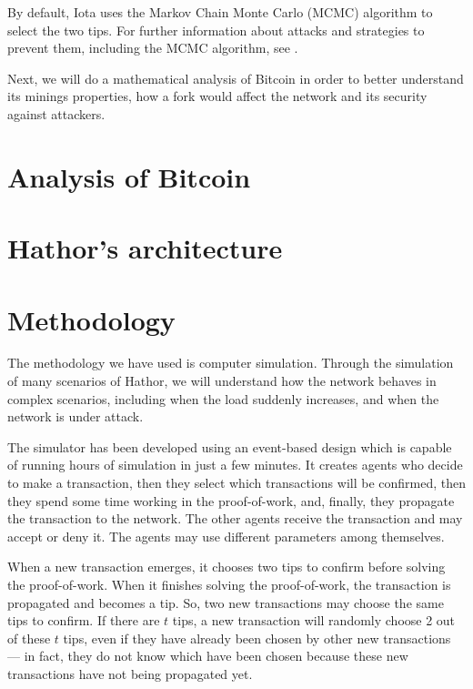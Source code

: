 By default, Iota uses the Markov Chain Monte Carlo (MCMC) algorithm to select the two tips. For further information about attacks and strategies to prevent them, including the MCMC algorithm, see \cite{tangle2016}.

Next, we will do a mathematical analysis of Bitcoin in order to better understand its minings properties, how a fork would affect the network and its security against attackers.


\chapter{Analysis of Bitcoin}



\chapter{Hathor's architecture}



\chapter{Methodology}

The methodology we have used is computer simulation. Through the simulation of many scenarios of Hathor, we will understand how the network behaves in complex scenarios, including when the load suddenly increases, and when the network is under attack.

The simulator has been developed using an event-based design which is capable of running hours of simulation in just a few minutes. It creates agents who decide to make a transaction, then they select which transactions will be confirmed, then they spend some time working in the proof-of-work, and, finally, they propagate the transaction to the network. The other agents receive the transaction and may accept or deny it. The agents may use different parameters among themselves.

When a new transaction emerges, it chooses two tips to confirm before solving the proof-of-work. When it finishes solving the proof-of-work, the transaction is propagated and becomes a tip. So, two new transactions may choose the same tips to confirm. If there are $t$ tips, a new transaction will randomly choose 2 out of these $t$ tips, even if they have already been chosen by other new transactions --- in fact, they do not know which have been chosen because these new transactions have not being propagated yet.

